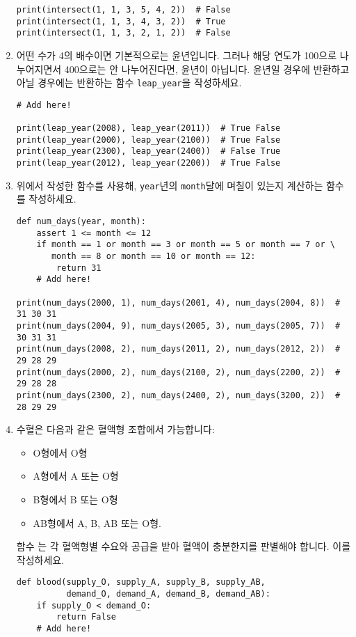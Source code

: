 \documentclass[../main.tex]{subfiles}
\begin{document}
\begin{enumerate}
\begin{verbatim}
print(intersect(1, 1, 3, 5, 4, 2))  # False
print(intersect(1, 1, 3, 4, 3, 2))  # True
print(intersect(1, 1, 3, 2, 1, 2))  # False
\end{verbatim}

\item 어떤 수가 4의 배수이면 기본적으로는 윤년입니다. 그러나 해당 연도가 100으로
  나누어지면서 400으로는 안 나누어진다면, 윤년이 아닙니다. 윤년일 경우에
   반환하고 아닐 경우에는  반환하는 함수
  \verb|leap_year|을 작성하세요.
\begin{verbatim}
# Add here!

print(leap_year(2008), leap_year(2011))  # True False
print(leap_year(2000), leap_year(2100))  # True False
print(leap_year(2300), leap_year(2400))  # False True
print(leap_year(2012), leap_year(2200))  # True False
\end{verbatim}

\item 위에서 작성한  함수를 사용해, \verb/year/년의 \verb/month/달에 며칠이 있는지 계산하는 함수 를 작성하세요.
\begin{verbatim}
def num_days(year, month):
    assert 1 <= month <= 12
    if month == 1 or month == 3 or month == 5 or month == 7 or \
       month == 8 or month == 10 or month == 12:
        return 31
    # Add here!

print(num_days(2000, 1), num_days(2001, 4), num_days(2004, 8))  # 31 30 31
print(num_days(2004, 9), num_days(2005, 3), num_days(2005, 7))  # 30 31 31
print(num_days(2008, 2), num_days(2011, 2), num_days(2012, 2))  # 29 28 29
print(num_days(2000, 2), num_days(2100, 2), num_days(2200, 2))  # 29 28 28
print(num_days(2300, 2), num_days(2400, 2), num_days(3200, 2))  # 28 29 29
\end{verbatim}

\item 수혈은 다음과 같은 혈액형 조합에서 가능합니다:
\begin{itemize}
\item O형에서 O형
\item A형에서 A 또는 O형
\item B형에서 B 또는 O형
\item AB형에서 A, B, AB 또는 O형.
\end{itemize}
함수 는 각 혈액형별 수요와 공급을 받아 혈액이 충분한지를 판별해야 합니다.
이를 작성하세요.
\begin{verbatim}
def blood(supply_O, supply_A, supply_B, supply_AB,
          demand_O, demand_A, demand_B, demand_AB):
    if supply_O < demand_O:
        return False
    # Add here!


\end{verbatim}
\end{enumerate}
\end{document}
